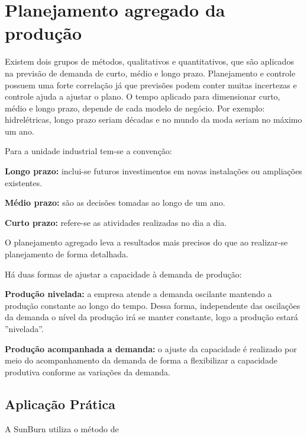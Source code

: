 \chapter{Planejamento agregado da produção} 
\label{chap:planejamento_agregado} 

Existem dois grupos de métodos, qualitativos e quantitativos, que são aplicados na previsão de demanda de curto, médio e longo prazo.
Planejamento e controle possuem uma forte correlação já que previsões podem conter muitas incertezas e controle ajuda a ajustar o plano.
O tempo aplicado para dimensionar curto, médio e longo prazo, depende de cada modelo de negócio. Por exemplo: hidrelétricas, longo prazo seriam décadas e no mundo da moda seriam no máximo um ano.

Para a unidade industrial tem-se a convenção:

\textbf{Longo prazo:} inclui-se futuros investimentos em novas instalações ou ampliações existentes.

\textbf{Médio prazo:} são as decisões tomadas ao longo de um ano.

\textbf{Curto prazo:} refere-se as atividades realizadas no dia a dia.

O planejamento agregado leva a resultados mais precisos do que ao realizar-se planejamento de forma detalhada.

Há duas formas de ajustar a capacidade à demanda de produção:

\textbf{Produção nivelada:} a empresa atende a demanda oscilante mantendo a produção constante ao longo do tempo. Dessa forma, independente das oscilações da demanda o nível da produção irá se manter constante, logo a produção estará ''nivelada''. 

\textbf{Produção acompanhada a demanda:} o ajuste da capacidade é realizado por meio do acompanhamento da demanda de forma a flexibilizar a capacidade produtiva conforme as variações da demanda.


\section{Aplicação Prática} 
\label{sec:planejamento_agregado_aplicacao}

A SunBurn utiliza o método de 


